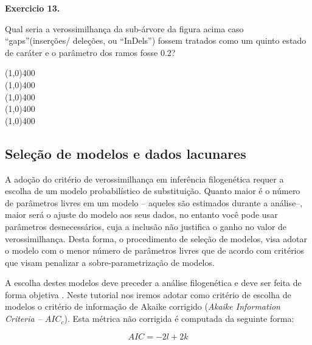 \begin{refsection}
\begin{blackBlock}{\textbf{Exercicio 13.}}\label{tut12:ex:13.4}

Qual seria a verossimilhança da sub-árvore da figura acima caso ``gaps''(inserções/ deleções, ou ``InDels'') fossem tratados como um quinto estado de caráter e o parâmetro dos ramos fosse 0.2?

\end{blackBlock}

\begin{center}
\line(1,0){400}\\
\line(1,0){400}\\
\line(1,0){400}\\
\line(1,0){400}\\
\line(1,0){400}\\
\end{center}

\subsection{Seleção de modelos e dados lacunares}\label{tut12:first_sec:model}

A adoção do critério de verossimilhança em inferência filogenética requer a escolha de um modelo probabilístico de substituição. Quanto maior é o número de parâmetros livres em um modelo -- aqueles são estimados durante a análise--, maior será o ajuste do modelo aos seus dados, no entanto você pode usar parâmetros desnecessários, cuja a inclusão não justifica o ganho no valor de verossimilhança. Desta forma, o procedimento de seleção de modelos, visa adotar o modelo com o menor número de parâmetros livres que de acordo com critérios que visam penalizar a sobre-parametrização de modelos.

A escolha destes modelos deve preceder a análise filogenética e deve ser feita de forma objetiva \parencite[veja conceitos e referências em][]{Darriba_and_Posada_2015}. Neste tutorial nos iremos adotar como critério de escolha de modelos o critério de informação de Akaike corrigido (\textit{Akaike Information Criteria -- $AIC_{c}$}). Esta métrica não corrigida é computada da seguinte forma:

\begin{center}
\begin{equation}\label{tut12:first_sec:model_aic}
AIC = -2l + 2k
\end{equation}
\end{center}


\end{refsection}
